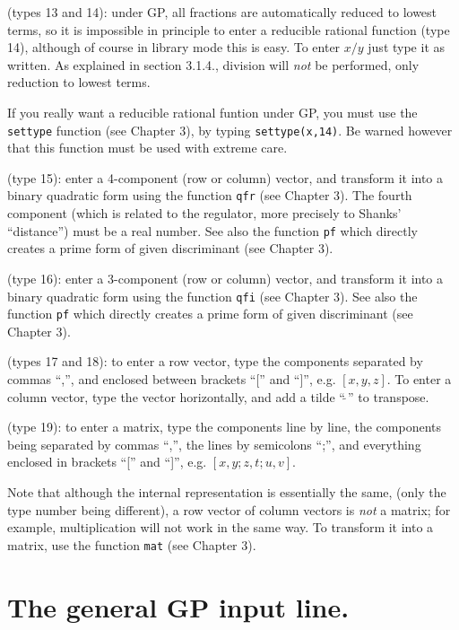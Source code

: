  (types 13 and 14): under GP, all
fractions are automatically reduced to lowest terms, so it is impossible
in principle to enter a reducible rational function (type 14), although of 
course in library mode this is easy. To enter $x/y$ just type it as written.
As explained in section 3.1.4., division will {\sl not} be performed, only
reduction to lowest terms.

If you really want a reducible rational funtion under GP, you must use the 
{\tt settype} function (see Chapter 3), by typing {\tt settype(x,14)}. Be
warned however that this function must be used with extreme care.

 (type 15):
enter a 4-component (row or column) vector, and transform it into a binary
quadratic form using the function {\tt qfr} (see Chapter 3). The fourth component
(which is related to the regulator, more precisely to Shanks' ``distance'')
must be a real number. See also the function {\tt pf} which directly creates
a prime form of given discriminant (see Chapter 3).

 (type 16):
enter a 3-component (row or column) vector, and transform it into a binary
quadratic form using the function {\tt qfi} (see Chapter 3). See also the
function {\tt pf} which directly creates a prime form of given discriminant
(see Chapter 3).

(types 17 and 18):
to enter a row vector, type the components separated by commas ``,'',
and enclosed between brackets ``['' and ``]'', e.g. $[x,y,z]$.
To enter a column vector, type the vector horizontally, and add a tilde
``$\tilde{\ }$'' to transpose.

 (type 19): to enter a matrix, type the
components line by line, the components being separated by commas ``,'',
the lines by semicolons ``;'', and everything enclosed in brackets
``['' and ``]'', e.g. $[x,y;z,t;u,v]$.

Note that although the internal representation is essentially the same,
(only the type number being different), a row vector of column vectors is
{\sl not} a matrix; for example, multiplication will not work in the same way.
To transform it into a matrix, use the function {\tt mat} (see Chapter 3).

\section{The general GP input line.}

